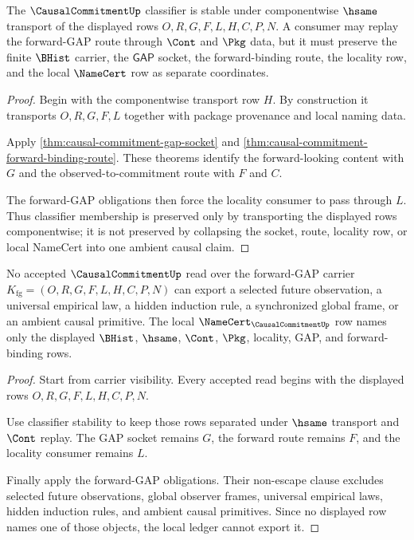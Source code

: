 \begin{theorem}
\label{thm:causal-commitment-classifier-stability}
The $\CausalCommitmentUp$ classifier is stable under componentwise $\hsame$ transport of the displayed rows $O,R,G,F,L,H,C,P,N$. A consumer may replay the forward-GAP route through $\Cont$ and $\Pkg$ data, but it must preserve the finite $\BHist$ carrier, the $\mathsf{GAP}$ socket, the forward-binding route, the locality row, and the local $\NameCert$ row as separate coordinates.
\end{theorem}
\begin{proof}
Begin with the componentwise transport row $H$. By construction it transports $O,R,G,F,L$ together with package provenance and local naming data.

Apply \autoref{thm:causal-commitment-gap-socket} and \autoref{thm:causal-commitment-forward-binding-route}. These theorems identify the forward-looking content with $G$ and the observed-to-commitment route with $F$ and $C$.

The forward-GAP obligations then force the locality consumer to pass through $L$. Thus classifier membership is preserved only by transporting the displayed rows componentwise; it is not preserved by collapsing the socket, route, locality row, or local NameCert into one ambient causal claim.
\end{proof}

\begin{theorem}
\label{thm:causal-commitment-ledger-nonescape}
No accepted $\CausalCommitmentUp$ read over the forward-GAP carrier $K_{\mathrm{fg}}=(O,R,G,F,L,H,C,P,N)$ can export a selected future observation, a universal empirical law, a hidden induction rule, a synchronized global frame, or an ambient causal primitive. The local $\NameCert_{\CausalCommitmentUp}$ row names only the displayed $\BHist$, $\hsame$, $\Cont$, $\Pkg$, locality, GAP, and forward-binding rows.
\end{theorem}
\begin{proof}
Start from carrier visibility. Every accepted read begins with the displayed rows $O,R,G,F,L,H,C,P,N$.

Use classifier stability to keep those rows separated under $\hsame$ transport and $\Cont$ replay. The GAP socket remains $G$, the forward route remains $F$, and the locality consumer remains $L$.

Finally apply the forward-GAP obligations. Their non-escape clause excludes selected future observations, global observer frames, universal empirical laws, hidden induction rules, and ambient causal primitives. Since no displayed row names one of those objects, the local ledger cannot export it.
\end{proof}

